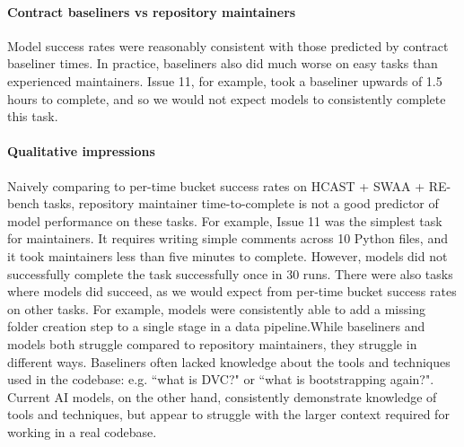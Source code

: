 \documentclass{article}
\newcommand{\gabenchmark}{HCAST}
\begin{document}
\paragraph{Contract baseliners vs repository maintainers} Model success rates were reasonably consistent with those predicted by contract baseliner times.
In practice, baseliners also did much worse on easy tasks than experienced maintainers. 
Issue 11, for example, took a baseliner upwards of 1.5 hours to complete, and so we would not expect models to consistently complete this task.


\paragraph{Qualitative impressions} Naively comparing to per-time bucket success rates on \gabenchmark{} + SWAA + RE-bench tasks, repository maintainer time-to-complete is not a good predictor of model performance on these tasks.  For example, Issue 11 was the simplest task for maintainers. It requires writing simple comments across 10 Python files, and it took maintainers less than five minutes to complete. However, models did not successfully complete the task successfully once in 30 runs. There were also tasks where models did succeed, as we would expect from per-time bucket success rates on other tasks. For example, models were consistently able to add a missing folder creation step to a single stage in a data pipeline.While baseliners and models both struggle compared to repository maintainers, they struggle in different ways. Baseliners often lacked knowledge about the tools and techniques used in the codebase: e.g. ``what is DVC?" or ``what is bootstrapping again?". Current AI models, on the other hand, consistently demonstrate knowledge of tools and techniques, but appear to struggle with the larger context required for working in a real codebase.
\end{document}
